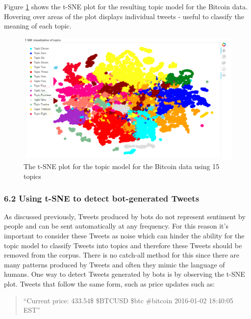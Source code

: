 \documentclass[
]{article}
\begin{document}
Figure \ref{fig:tsne3} shows the t-SNE plot for the resulting topic
model for the Bitcoin data. Hovering over areas of the plot displays
individual tweets - useful to classify the meaning of each topic.

\begin{figure}

{\centering \includegraphics[width=1\linewidth]{images/tsne1} 

}

\caption{The  t-SNE plot for the topic model for the Bitcoin data using 15 topics}\label{fig:tsne3}
\end{figure}

\hypertarget{using-t-sne-to-detect-bot-generated-tweets}{%
\subsubsection{6.2 Using t-SNE to detect bot-generated
Tweets}\label{using-t-sne-to-detect-bot-generated-tweets}}

As discussed previously, Tweets produced by bots do not represent
sentiment by people and can be sent automatically at any frequency. For
this reason it's important to consider these Tweets as noise which can
hinder the ability for the topic model to classify Tweets into topics
and therefore these Tweets should be removed from the corpus. There is
no catch-all method for this since there are many patterns produced by
Tweets and often they mimic the language of humans. One way to detect
Tweets generated by bots is by observing the t-SNE plot. Tweets that
follow the same form, such as price updates such as:

\begin{quote}
``Current price: 433.54\$ \$BTCUSD \$btc \#bitcoin 2016-01-02 18:40:05
EST''
\end{quote}
\end{document}
